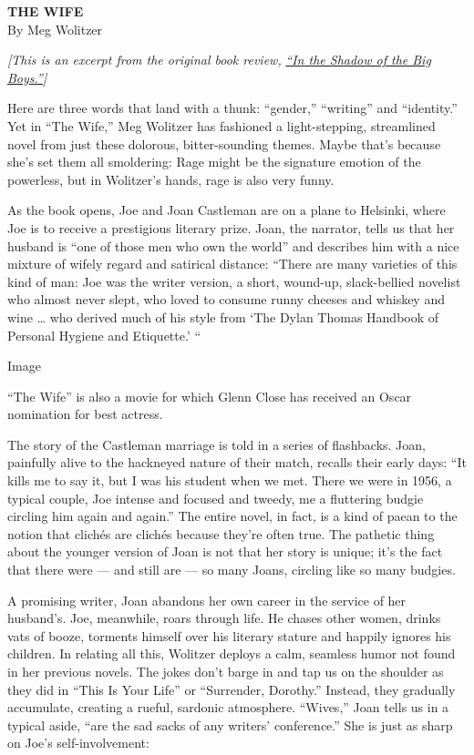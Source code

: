 \textbf{THE WIFE}\\
By Meg Wolitzer

\emph{{[}This is an excerpt from the original book review,}
\href{https://www.nytimes3xbfgragh.onion/2003/04/20/books/in-the-shadow-of-the-big-boys.html}{\emph{``In
the Shadow of the Big Boys.''}}\emph{{]}}

Here are three words that land with a thunk: ``gender,'' ``writing'' and
``identity.'' Yet in ``The Wife,'' Meg Wolitzer has fashioned a
light-stepping, streamlined novel from just these dolorous,
bitter-sounding themes. Maybe that's because she's set them all
smoldering: Rage might be the signature emotion of the powerless, but in
Wolitzer's hands, rage is also very funny.

As the book opens, Joe and Joan Castleman are on a plane to Helsinki,
where Joe is to receive a prestigious literary prize. Joan, the
narrator, tells us that her husband is ``one of those men who own the
world'' and describes him with a nice mixture of wifely regard and
satirical distance: ``There are many varieties of this kind of man: Joe
was the writer version, a short, wound-up, slack-bellied novelist who
almost never slept, who loved to consume runny cheeses and whiskey and
wine \ldots{} who derived much of his style from `The Dylan Thomas
Handbook of Personal Hygiene and Etiquette.' ``

Image

``The Wife'' is also a movie for which Glenn Close has received an Oscar
nomination for best actress.

The story of the Castleman marriage is told in a series of flashbacks.
Joan, painfully alive to the hackneyed nature of their match, recalls
their early days: ``It kills me to say it, but I was his student when we
met. There we were in 1956, a typical couple, Joe intense and focused
and tweedy, me a fluttering budgie circling him again and again.'' The
entire novel, in fact, is a kind of paean to the notion that clichés are
clichés because they're often true. The pathetic thing about the younger
version of Joan is not that her story is unique; it's the fact that
there were --- and still are --- so many Joans, circling like so many
budgies.

A promising writer, Joan abandons her own career in the service of her
husband's. Joe, meanwhile, roars through life. He chases other women,
drinks vats of booze, torments himself over his literary stature and
happily ignores his children. In relating all this, Wolitzer deploys a
calm, seamless humor not found in her previous novels. The jokes don't
barge in and tap us on the shoulder as they did in ``This Is Your Life''
or ``Surrender, Dorothy.'' Instead, they gradually accumulate, creating
a rueful, sardonic atmosphere. ``Wives,'' Joan tells us in a typical
aside, ``are the sad sacks of any writers' conference.'' She is just as
sharp on Joe's self-involvement:

